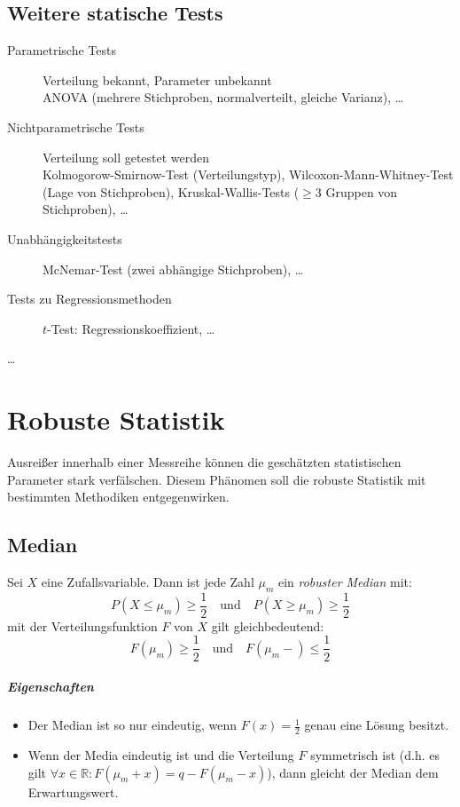 \documentclass[a4paper, 11pt, accentcolor = tud3b]{tudreport}
\newcommand{\R}{\ensuremath{\mathbb{R}}}
\begin{document}
        \section{Weitere statische Tests}
	        \begin{description}
	        	\item[Parametrische Tests] Verteilung bekannt, Parameter unbekannt \\ ANOVA (mehrere Stichproben, normalverteilt, gleiche Varianz), \dots
	        	\item[Nichtparametrische Tests] Verteilung soll getestet werden \\ Kolmogorow-Smirnow-Test (Verteilungstyp), Wilcoxon-Mann-Whitney-Test (Lage von Stichproben), Kruskal-Wallis-Tests (\(\geq 3\) Gruppen von Stichproben), \dots
	        	\item[Unabhängigkeitstests] McNemar-Test (zwei abhängige Stichproben), \dots
	        	\item[Tests zu Regressionsmethoden] \(t\)-Test: Regressionskoeffizient, \dots
	        	\item[\dots]
	        \end{description}

    \chapter{Robuste Statistik}
        Ausreißer innerhalb einer Messreihe können die geschätzten statistischen Parameter stark verfälschen. Diesem Phänomen soll die robuste Statistik mit bestimmten Methodiken entgegenwirken.

        \section{Median}
            Sei \(X\) eine Zufallsvariable. Dann ist jede Zahl \( \mu_m \) ein \textit{robuster Median} mit:
            \begin{equation*}
	            P(X \leq \mu_m) \geq \frac{1}{2} \quad \textrm{und} \quad P(X \geq \mu_m) \geq \frac{1}{2}
            \end{equation*}
            mit der Verteilungsfunktion \(F\) von \(X\) gilt gleichbedeutend:
            \begin{equation*}
	            F(\mu_m) \geq \frac{1}{2} \quad \textrm{und} \quad F(\mu_m-) \leq \frac{1}{2}
            \end{equation*}
            
            \paragraph{Eigenschaften}
	            \begin{itemize}
	            	\item Der Median ist so nur eindeutig, wenn \( F(x) = \frac{1}{2} \) genau eine Lösung besitzt.
	            	\item Wenn der Media eindeutig ist und die Verteilung \(F\) symmetrisch ist (d.h. es gilt \( \forall x \in \R : F(\mu_m + x) = q - F(\mu_m - x) \)), dann gleicht der Median dem Erwartungswert.
	            \end{itemize}
\end{document}
